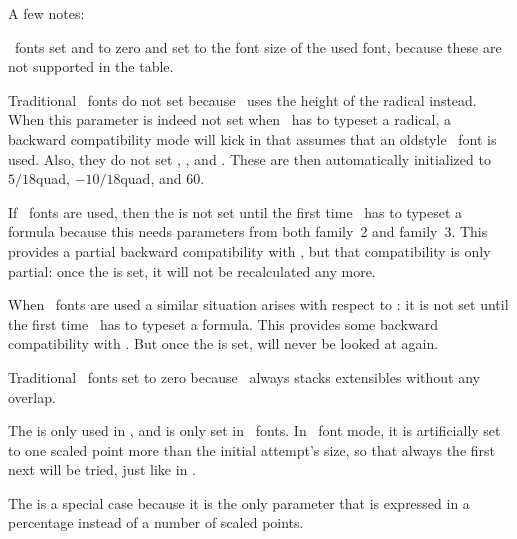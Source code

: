 A few notes:

\startitemize[n]

\startitem
    \OPENTYPE\ fonts set \typ {\Umathlimitabovekern} and \typ
    {\Umathlimitbelowkern} to zero and set \typ {\Umathquad} to the font size of
    the used font, because these are not supported in the  table.
\stopitem

\startitem
    Traditional \TFM\ fonts do not set \typ {\Umathradicalrule} because \
    uses the height of the radical instead. When this parameter is indeed not set
    when \LUATEX\ has to typeset a radical, a backward compatibility mode will
    kick in that assumes that an oldstyle \TEX\ font is used. Also, they do not
    set \typ {\Umathradicaldegreebefore}, \typ {\Umathradicaldegreeafter}, and \typ
    {\Umathradicaldegreeraise}. These are then automatically initialized to
    $5/18$quad, $-10/18$quad, and 60.
\stopitem

\startitem
    If \TFM\ fonts are used, then the \typ {\Umathradicalvgap} is not set until
    the first time \LUATEX\ has to typeset a formula because this needs
    parameters from both family~2 and family~3. This provides a partial backward
    compatibility with \TEX82, but that compatibility is only partial: once the
    \typ {\Umathradicalvgap} is set, it will not be recalculated any more.
\stopitem

\startitem
    When \TFM\ fonts are used a similar situation arises with respect to \typ
    {\Umathspaceafterscript}: it is not set until the first time \LUATEX\ has to
    typeset a formula. This provides some backward compatibility with \TEX82. But
    once the \typ {\Umathspaceafterscript} is set, \typ {\scriptspace} will never
    be looked at again.
\stopitem

\startitem
    Traditional \TFM\ fonts set \typ {\Umathconnectoroverlapmin} to zero because
    \TEX82\ always stacks extensibles without any overlap.
\stopitem

\startitem
    The \typ {\Umathoperatorsize} is only used in \typ {\displaystyle}, and is only
    set in \OPENTYPE\ fonts. In \TFM\ font mode, it is artificially set to one
    scaled point more than the initial attempt's size, so that always the \quote
    {first next} will be tried, just like in \TEX82.
\stopitem

\startitem
    The \typ {\Umathradicaldegreeraise} is a special case because it is the only
    parameter that is expressed in a percentage instead of a number of scaled
    points.
\stopitem

